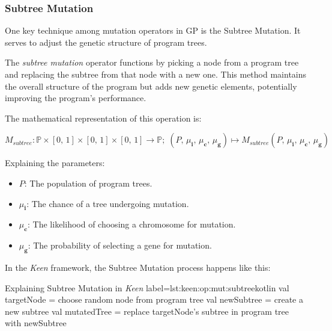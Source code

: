 \subsubsection{Subtree Mutation}
\label{sec:keen:op:mut:subtree}
    One key technique among mutation operators in GP is the Subtree Mutation. It serves to adjust the genetic structure 
    of program trees.

    \begin{definition}
        The \textit{subtree mutation} operator functions by picking a node from a program tree and replacing the subtree 
        from that node with a new one. This method maintains the overall structure of the program but adds new genetic 
        elements, potentially improving the program's performance.
    
        The mathematical representation of this operation is:
    
        \begin{equation}
            M_{subtree}: \mathbb{P} \times [0,\, 1] \times [0,\, 1] \times [0,\, 1] \rightarrow \mathbb{P};\;
            (P,\, \mu_\textbf{i},\, \mu_\textbf{c},\, \mu_\textbf{g}) 
                \mapsto M_{subtree}(P,\, \mu_\textbf{i},\, \mu_\textbf{c},\, \mu_\textbf{g})
        \end{equation}
    
        Explaining the parameters:
    
        \begin{itemize}
            \item \(P\): The population of program trees.
            \item \(\mu_\textbf{i}\): The chance of a tree undergoing mutation.
            \item \(\mu_\textbf{c}\): The likelihood of choosing a chromosome for mutation.
            \item \(\mu_\textbf{g}\): The probability of selecting a gene for mutation.
        \end{itemize}
    \end{definition}

    In the \textit{Keen} framework, the Subtree Mutation process happens like this:

    \begin{code}{
        Explaining Subtree Mutation in \textit{Keen}
    }{label=lst:keen:op:mut:subtree}{kotlin}
        val targetNode = choose random node from program tree
        val newSubtree = create a new subtree
        val mutatedTree = replace targetNode's subtree in program tree with newSubtree
    \end{code}

